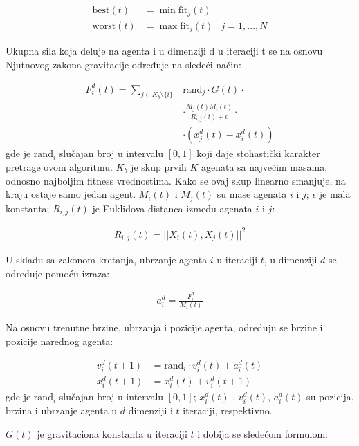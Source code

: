 \begin{align}
    \mathrm{best}(t) & = \min \mathrm{fit}_j(t) & \\
    \mathrm{worst}(t) & = \max \mathrm{fit}_j(t) & j = 1, \dots, N \nonumber
\end{align}

Ukupna sila koja deluje na agenta i u dimenziji d u iteraciji t se na osnovu Njutnovog zakona gravitacije određuje na sledeći način:

\begin{align}
    F_i^d(t) =  \sum_{j \in K_{b} \setminus \{i\}}
    & \mathrm{rand}_j \cdot G(t) \cdot \nonumber \\
    & \cdot \frac{M_j(t) M_i(t)}{R_{i,j}(t) + \epsilon} \cdot \nonumber \\
    & \cdot \left( x_j^d(t) - x_i^d(t) \right)
\end{align}
gde je $\mathrm{rand}_i$ slučajan broj u intervalu $[0,1]$ koji daje stohastički karakter pretrage ovom algoritmu. $K_{b}$ je skup prvih $K$ agenata sa najvećim masama, odnosno najboljim fitness vrednostima. Kako se ovaj skup linearno smanjuje, na kraju ostaje samo jedan agent. $M_i(t)$ i $M_j(t)$ su mase agenata $i$ i $j$; $\epsilon$ je mala konstanta; $R_{i,j}(t)$ je Euklidova distanca između agenata $i$ i $j$:

\begin{align*}
    R_{i,j}(t) = ||X_i(t), X_j(t)||^2
\end{align*}

U skladu sa zakonom kretanja, ubrzanje agenta $i$ u iteraciji $t$, u dimenziji $d$ se određuje pomoću izraza:

\begin{align}
    a_i^d = \frac{F_i^d}{M_i(t)}
\end{align}

Na osnovu trenutne brzine, ubrzanja i pozicije agenta, određuju se brzine i pozicije  narednog agenta:

\begin{align}
    v_i^d(t+1) & = \mathrm{rand}_i \cdot v_i^d(t) + a_i^d(t) \\
    x_i^d(t+1) & = x_i^d(t) + v_i^d(t+1)
\end{align}
gde je $\mathrm{rand}_i$ slučajan broj u intervalu $[0,1]$; $x_i^d(t)$ , $v_i^d(t)$, $a_i^d(t)$ su pozicija, brzina i ubrzanje agenta u $d$ dimenziji i $t$ iteraciji, respektivno.

$G(t)$ je gravitaciona konstanta u iteraciji $t$ i dobija se sledećom formulom:

